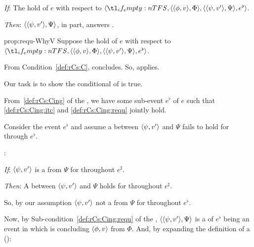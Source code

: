 \begin{note}
  \begin{proposition}
    \label{prop:requ-WhyV}
    \vspace{-\baselineskip}
    \begin{itenum}
    \item[\emph{If}:]
      The  hold of \(e\) with respect to \(\langle \vAgent{}, \pvp{\phi}{v}{\Phi}, \pvp{\psi}{v'}{\Psi}, e^{\flat} \rangle\).
    \item[\emph{Then}:]
      \(\langle \langle \psi, v' \rangle, \Psi \rangle\), in part, answers \qWhyV{}.
    \end{itenum}
    \vspace{-\baselineskip}
  \end{proposition}

  \begin{argument}{prop:requ-WhyV}
    Suppose the  hold of \(e\) with respect to \(\langle \vAgent{}, \pvp{\phi}{v}{\Phi}, \pvp{\psi}{v'}{\Psi}, e^{\flat} \rangle\).

    From Condition~\ref{def:rCs:C}, concludes.
    So, \qWhyV{} applies.

    Our task is to show the conditional of \qWhyV{} is true.

    From~\ref{def:rCs:Cing} of the \rCon{}, we have some sub-event \(e^{\flat}\) of \(e\) such that \ref{def:rCs:Cing:itc} and \ref{def:rCs:Cing:requ} jointly hold.

    Consider the event \(e^{\flat}\) and assume a \ros{} between \(\langle \psi, v' \rangle\) and \(\Psi\) fails to hold for \vAgent{} through \(e^{\flat}\).

    \supportII{}:

    \begin{itenum}
    \item[\emph{If}:]
      \(\langle \psi, v' \rangle\) is a  from \(\Psi\) for \vAgent{} throughout \(e^{\sharp}\).
    \item[\emph{Then}:]
      A  between \(\langle \psi, v' \rangle\) and \(\Psi\) holds for \vAgent{} throughout \(e^{\sharp}\).
    \end{itenum}

    \noindent%
    So, by our assumption \(\langle \psi, v' \rangle\) not a  from \(\Psi\) for \vAgent{} throughout \(e^{\flat}\).

    Now, by Sub-condition~\ref{def:rCs:Cing:requ} of the \rCon{}, \(\langle \langle \psi, v' \rangle, \Psi \rangle\) is a \requ{} of \(e^{\flat}\) being an event in which \vAgent{} is concluding \(\langle \phi, v \rangle\) from \(\Phi\).
    And, by expanding the definition of a \requ{} ():


\end{argument}
\end{note}
